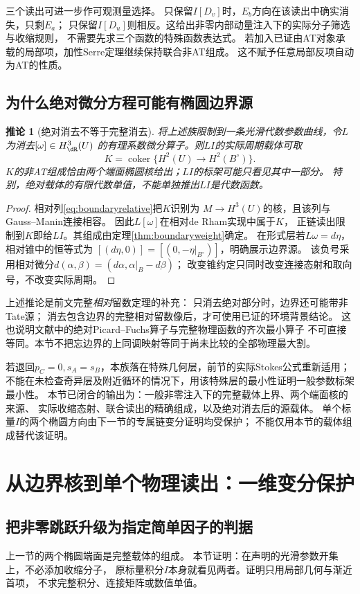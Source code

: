 \documentclass[11pt,a4paper]{ctexart}
\theoremstyle{cnplain}\newtheorem{theorem}{定理}[section]
\newtheorem{corollary}[theorem]{推论}
\theoremstyle{definition}\newtheorem{definition}[theorem]{定义}
\theoremstyle{remark}\newtheorem{remark}[theorem]{注}
\begin{document}
三个读出可进一步作可观测量选择。
只保留$I[D_v]$时，$E_b$方向在该读出中确实消失，只剩$E_a$；
只保留$I[D_u]$则相反。这给出非零内部动量注入下的实际分子筛选与收缩规则，
不需要先求三个函数的特殊函数表达式。
若加入已证由AT对象承载的局部项，加性Serre定理继续保持联合非AT组成。
这不赋予任意局部反项自动为AT的性质。

\subsection{为什么绝对微分方程可能有椭圆边界源}
\begin{corollary}[绝对消去不等于完整消去]\label{cor:boundarysource}
将上述族限制到一条光滑代数参数曲线，令$L$为消去$[\omega]\in H^3_{\dR}(U)$
的有理系数微分算子。则$LI$的实际周期载体可取
\[
 K=\operatorname{coker}\{H^2(U)\longrightarrow H^2(B^\circ)\}.
\]
$K$的非AT组成恰由两个端面椭圆核给出；$LI$的标架可能只看见其中一部分。
特别，绝对载体的有限代数单值，不能单独推出$LI$是代数函数。
\end{corollary}
\begin{proof}
相对列\eqref{eq:boundaryrelative}把$K$识别为
$M\to H^3(U)$的核，且该列与Gauss--Manin连接相容。
因此$L[\omega]$在相对de Rham实现中属于$K$，
正链读出限制到$K$即给$LI$。其组成由定理\ref{thm:boundaryweight}确定。
在形式层若$L\omega=d\eta$，相对锥中的恒等式为
$[(d\eta,0)]=[(0,-\eta|_{B^\circ})]$，明确展示边界源。
该负号采用相对微分$d(\alpha,\beta)=(d\alpha,\alpha|_B-d\beta)$；
改变锥约定只同时改变连接态射和取向号，不改变实际周期。
\end{proof}

上述推论是前文完整\emph{相对}留数定理的补充：
只消去绝对部分时，边界还可能带非Tate源；
消去包含边界的完整相对留数像后，才可使用已证的环境背景结论。
这也说明文献中的绝对Picard--Fuchs算子与完整物理函数的齐次最小算子
不可直接等同。本节不把忘边界的上同调映射等同于尚未比较的全部物理最大割。

若退回$p_C=0,s_A=s_B$，本族落在特殊几何层，前节的实际Stokes公式重新适用；
不能在未检查奇异层及附近循环的情况下，用该特殊层的最小性证明一般参数标架最小性。
本节已闭合的输出为：一般非零注入下的完整载体上界、两个端面核的来源、
实际收缩态射、联合读出的精确组成，以及绝对消去后的源载体。
单个标量$I$的两个椭圆方向由下一节的专属链变分证明均受保护；
不能仅用本节的载体组成替代该证明。


\section{从边界核到单个物理读出：一维变分保护}
\label{sec:scalarboundary}
\subsection{把非零跳跃升级为指定简单因子的判据}
上一节的两个椭圆端面是完整载体的组成。
本节证明：在声明的光滑参数开集上，不必添加收缩分子，
原标量积分$I$本身就看见两者。证明只用局部几何与渐近首项，
不求完整积分、连接矩阵或数值单值。
\end{document}
